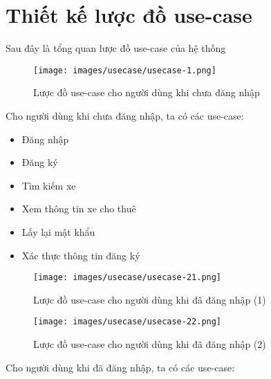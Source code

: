 \documentclass[../main.tex]{subfiles}
\begin{document}
	\section{Thiết kế lược đồ use-case}


	Sau đây là tổng quan lược đồ use-case của hệ thống

	\begin{figure}[ht]
		\centering
		\texttt{[image: images/usecase/usecase-1.png]}
		\caption{Lược đồ use-case cho người dùng khi chưa đăng nhập}
		\label{fig:usecase_1}
	\end{figure}

	Cho người dùng khi chưa đăng nhập, ta có các use-case:

	\begin{itemize}
		\item Đăng nhập
		\item Đăng ký
		\item Tìm kiếm xe
		\item Xem thông tin xe cho thuê
		\item Lấy lại mật khẩu
		\item Xác thực thông tin đăng ký
	\end{itemize}

	\begin{figure}[ht]
		\centering
		\texttt{[image: images/usecase/usecase-21.png]}
		\caption{Lược đồ use-case cho người dùng khi đã đăng nhập (1)}
		\label{fig:usecase_21}
	\end{figure}

	\begin{figure}[ht]
		\centering
		\texttt{[image: images/usecase/usecase-22.png]}
		\caption{Lược đồ use-case cho người dùng khi đã đăng nhập (2)}
		\label{fig:usecase_22}
	\end{figure}

	Cho người dùng khi đã đăng nhập, ta có các use-case:
\end{document}
